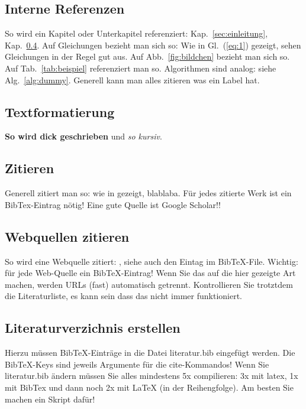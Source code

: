 \documentclass[12pt,oneside]{article}
\begin{document}
\subsection{Interne Referenzen}
So wird ein Kapitel oder Unterkapitel referenziert: Kap.~\ref{sec:einleitung},
Kap.~\ref{sec:webquellen}. Auf Gleichungen bezieht man sich so: Wie in Gl.~(\ref{eq:1}) gezeigt,
sehen Gleichungen in der Regel gut aus. Auf Abb.~\ref{fig:bildchen} bezieht man sich so. Auf
Tab.~\ref{tab:beispiel} referenziert man so. Algorithmen sind analog: siehe Alg.~\ref{alg:dummy}.
Generell kann man alles zitieren was ein Label hat.

\subsection{Textformatierung}
\textbf{So wird dick geschrieben} und \textit{so kursiv}.

\subsection{Zitieren}\label{sec:zitate}
Generell zitiert man so: wie in \cite{clemen1989combining} gezeigt, blablaba. Für jedes zitierte Werk ist ein BibTex-Eintrag nötig! Eine gute Quelle ist Google Scholar!!

\subsection{Webquellen zitieren}\label{sec:webquellen}
So wird eine Webquelle zitiert: \cite{shiny1}, siehe auch den Eintag im BibTeX-File.
Wichtig: für jede Web-Quelle ein BibTeX-Eintrag! Wenn Sie das auf die hier gezeigte Art machen, werden URLs (fast) automatisch getrennt. Kontrollieren Sie trotztdem die Literaturliste, es kann sein dass das nicht immer funktioniert.

\subsection{Literaturverzichnis erstellen}
Hierzu müssen BibTeX-Einträge in die Datei literatur.bib eingefügt werden. Die BibTeX-Keys sind jeweils Argumente für die cite-Kommandos! Wenn Sie literatur.bib ändern müssen Sie alles mindestens 5x compilieren: 3x mit latex, 1x mit BibTex und dann noch 2x mit LaTeX (in der Reihengfolge). Am besten Sie machen ein Skript dafür!

\end{document}
